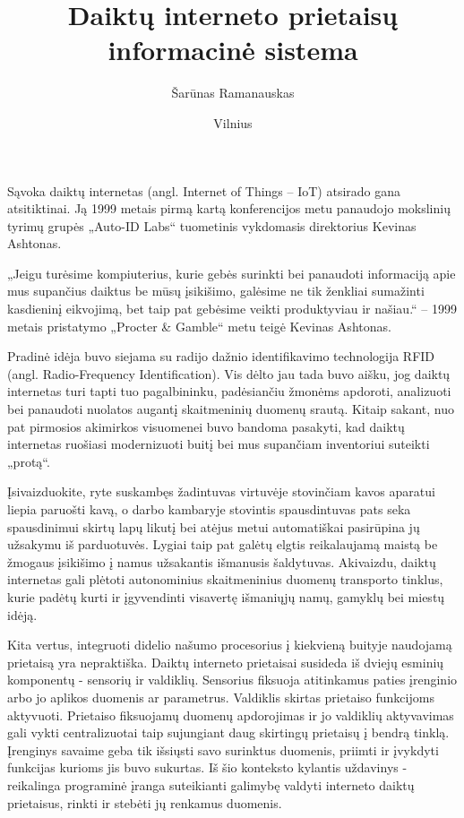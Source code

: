 \documentclass{VUMIFInfBakalaurinis}
\institute{Informatikos institutas}  %
\title{Daiktų interneto prietaisų informacinė sistema}
\author{Šarūnas Ramanauskas}
\date{Vilnius \\ \the\year}
\begin{document}
\maketitle

\tableofcontents


Sąvoka daiktų internetas (angl. Internet of Things – IoT) atsirado gana atsitiktinai.
Ją 1999 metais pirmą kartą konferencijos metu panaudojo mokslinių tyrimų grupės „Auto-ID Labs“ tuometinis vykdomasis direktorius Kevinas Ashtonas.

„Jeigu turėsime kompiuterius, kurie gebės surinkti bei panaudoti informaciją apie mus supančius daiktus be mūsų įsikišimo,
galėsime ne tik ženkliai sumažinti kasdieninį eikvojimą, bet taip pat gebėsime veikti produktyviau ir našiau.“
– 1999 metais pristatymo „Procter \& Gamble“ metu teigė Kevinas Ashtonas.

Pradinė idėja buvo siejama su radijo dažnio identifikavimo technologija RFID (angl. Radio-Frequency Identification).
Vis dėlto jau tada buvo aišku, jog daiktų internetas turi tapti tuo pagalbininku, padėsiančiu žmonėms apdoroti,
analizuoti bei panaudoti nuolatos augantį skaitmeninių duomenų srautą.
Kitaip sakant, nuo pat pirmosios akimirkos visuomenei buvo bandoma pasakyti,
kad daiktų internetas ruošiasi modernizuoti buitį bei mus supančiam inventoriui suteikti „protą“.

Įsivaizduokite, ryte suskambęs žadintuvas virtuvėje stovinčiam kavos aparatui liepia paruošti kavą,
o darbo kambaryje stovintis spausdintuvas pats seka spausdinimui skirtų lapų likutį bei atėjus metui automatiškai
pasirūpina jų užsakymu iš parduotuvės. Lygiai taip pat galėtų elgtis reikalaujamą maistą be žmogaus įsikišimo į namus užsakantis
išmanusis šaldytuvas. Akivaizdu, daiktų internetas gali plėtoti autonominius skaitmeninius duomenų transporto tinklus,
kurie padėtų kurti ir įgyvendinti visavertę išmaniųjų namų, gamyklų bei miestų idėją.

Kita vertus, integruoti didelio našumo procesorius į kiekvieną buityje naudojamą prietaisą yra nepraktiška. Daiktų interneto prietaisai susideda
iš dviejų esminių komponentų - sensorių ir valdiklių. Sensorius fiksuoja atitinkamus paties įrenginio arbo jo aplikos duomenis ar parametrus.
Valdiklis skirtas prietaiso funkcijoms aktyvuoti. Prietaiso fiksuojamų duomenų apdorojimas ir jo valdiklių aktyvavimas gali vykti centralizuotai taip sujungiant 
daug skirtingų prietaisų į bendrą tinklą. Įrenginys savaime geba tik išsiųsti savo surinktus duomenis, priimti ir įvykdyti funkcijas kurioms jis buvo sukurtas.
Iš šio konteksto kylantis uždavinys - reikalinga programinė įranga suteikianti galimybę valdyti interneto daiktų prietaisus, rinkti ir stebėti jų renkamus duomenis.
\end{document}
